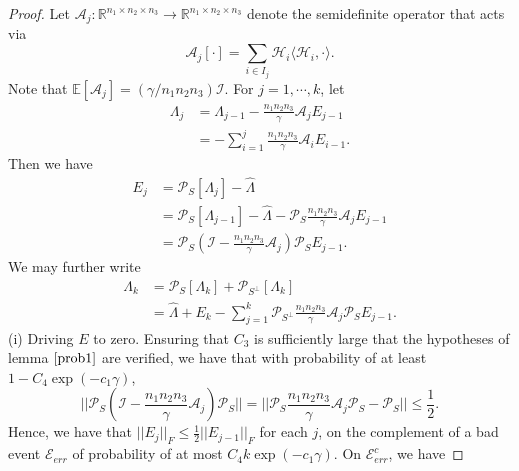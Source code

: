 \documentclass[journal,transmag]{IEEEtran}
\theoremstyle{plain}
\begin{document}
\begin{proof}
 Let $\mathcal{A}_j:\mathbb{R}^{n_1 \times n_2 \times n_3}\rightarrow\mathbb{R}^{n_1 \times n_2 \times n_3}$ denote the semidefinite operator that acts via
 \begin{equation}
 \mathcal{A}_j[\cdot] = \sum_{i\in I_j}\mathcal{H}_i\langle\mathcal{H}_i,\cdot\rangle.
 \end{equation}
Note that $\mathbb{E}[\mathcal{A}_j]=(\gamma/n_1 n_2 n_3)\mathcal{I}$. For $j=1,\cdots,k$, let
\begin{equation}
\begin{split}
\Lambda_j &= \Lambda_{j-1} - \frac{n_1 n_2 n_3}{\gamma}\mathcal{A}_j E_{j-1}\\
&= -\sum^j_{i=1}\frac{n_1 n_2 n_3}{\gamma}\mathcal{A}_i E_{i-1}.
\end{split}
\end{equation}
Then we have
\begin{equation}
\begin{split}
E_j &= \mathcal{P}_S[\Lambda_j]-\hat{\Lambda}\\
&= \mathcal{P}_S[\Lambda_{j-1}]-\hat{\Lambda}-\mathcal{P}_S \frac{n_1 n_2 n_3}{\gamma}\mathcal{A}_j E_{j-1}\\
&= \mathcal{P}_S (\mathcal{I}-\frac{n_1 n_2 n_3}{\gamma}\mathcal{A}_j)\mathcal{P}_S E_{j-1}.
\end{split}
\end{equation}
We may further write
\begin{equation}
\begin{split}
\Lambda_k &= \mathcal{P}_S [\Lambda_k]+\mathcal{P}_{S^{\bot}} [\Lambda_k]\\
& = \hat{\Lambda}+E_k-\sum^k_{j=1}\mathcal{P}_{S^{\bot}}\frac{n_1 n_2 n_3}{\gamma}\mathcal{A}_j \mathcal{P}_S E_{j-1}.
\end{split}
\end{equation}
(i) Driving $E$ to zero. Ensuring that $C_3$ is sufficiently large that the hypotheses of lemma $\ref{prob1}$ are verified, we have that with probability of at least $1-C_4 \exp(-c_1 \gamma)$,
\begin{equation}
||\mathcal{P}_S(\mathcal{I}-\frac{n_1 n_2 n_3}{\gamma}\mathcal{A}_j)\mathcal{P}_S|| = ||\mathcal{P}_S \frac{n_1 n_2 n_3}{\gamma} \mathcal{A}_j \mathcal{P}_S -\mathcal{P}_S ||\le \frac{1}{2}.
\end{equation}
Hence, we have that $||E_j||_F\le \frac{1}{2}||E_{j-1}||_F$ for each $j$, on the complement of a bad event $\mathcal{E}_{err}$ of probability of at most $C_4 k \exp(-c_1 \gamma)$. On $\mathcal{E}_{err}^c$, we have

\end{proof}
\end{document}
